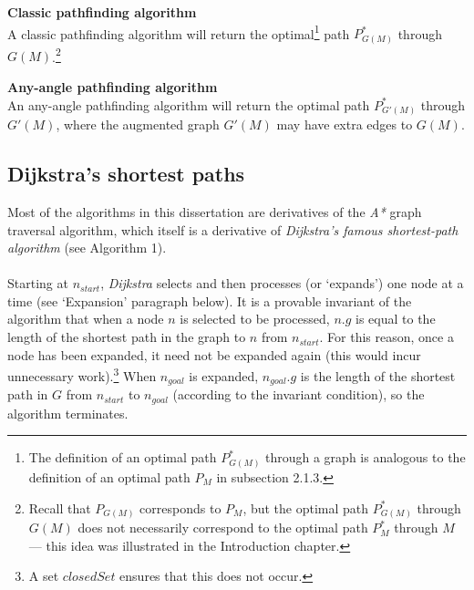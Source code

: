 \documentclass[12pt,notitlepage]{report}
\begin{document}
\begin{description}
\item{\bfseries Classic pathfinding algorithm}\\
A classic pathfinding algorithm will return the optimal\footnote{The definition of an optimal path $P^{*}_{G(M)}$ through a graph is analogous to the definition of an optimal path $P_{M}$ in subsection 2.1.3.}  path $P^{*}_{G(M)}$ through $G(M)$.\footnote{Recall that $P_{G(M)}$ corresponds to $P_{M}$, but the optimal path $P^{*}_{G(M)}$ through $G(M)$ does not necessarily correspond to the optimal path $P^{*}_{M}$ through $M$ --- this idea was illustrated in the Introduction chapter.}
\item{\bfseries Any-angle pathfinding algorithm}\\
An any-angle pathfinding algorithm will return the optimal path $P^{*}_{G'(M)}$ through $G'(M)$, where the augmented graph $G'(M)$ may have extra edges to $G(M)$.
\end{description}

\subsection {Dijkstra's shortest paths}

Most of the algorithms in this dissertation are derivatives of the {\em A*} graph traversal algorithm, which itself is a derivative of {\em Dijkstra's famous shortest-path algorithm} (see Algorithm 1).\\

\\
\noindent
Starting at $n_{start}$, {\em Dijkstra} selects and then processes (or `expands') one node at a time (see `Expansion' paragraph below). It is a provable\cite{CormenDijkstra} invariant of the algorithm that when a node $n$ is selected to be processed, $n.g$ is equal to the length of the shortest path in the graph to $n$ from $n_{start}$. For this reason, once a node has been expanded, it need not be expanded again (this would incur unnecessary work).\footnote{A set $closedSet$ ensures that this does not occur.} When $n_{goal}$ is expanded, $n_{goal}.g$ is the length of the shortest path in $G$ from $n_{start}$ to $n_{goal}$ (according to the invariant condition), so the algorithm terminates.\\
\end{document}
